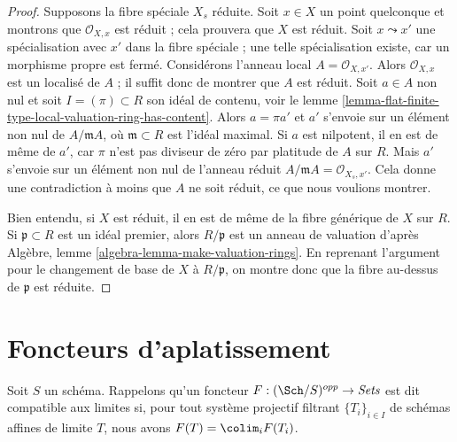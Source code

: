 \begin{proof}
Supposons la fibre spéciale $X_s$ réduite.
Soit $x \in X$ un point quelconque et montrons que $\mathcal{O}_{X, x}$
est réduit ; cela prouvera que $X$ est réduit.
Soit $x \leadsto x'$ une spécialisation avec $x'$
dans la fibre spéciale ; une telle spécialisation existe,
car un morphisme propre est fermé. Considérons l'anneau
local $A = \mathcal{O}_{X, x'}$. Alors $\mathcal{O}_{X, x}$
est un localisé de $A$ ; il suffit donc de montrer que
$A$ est réduit. Soit $a \in A$ non nul et soit $I = (\pi) \subset R$ son
idéal de contenu, voir le
lemme \ref{lemma-flat-finite-type-local-valuation-ring-has-content}.
Alors $a = \pi a'$ et $a'$ s'envoie sur un élément non nul de
$A/\mathfrak mA$, où $\mathfrak m \subset R$ est l'idéal maximal.
Si $a$ est nilpotent, il en est de même de $a'$, car $\pi$ n'est pas diviseur de zéro
par platitude de $A$ sur $R$.
Mais $a'$ s'envoie sur un élément non nul de l'anneau réduit
$A/\mathfrak m A = \mathcal{O}_{X_s, x'}$.
Cela donne une contradiction à moins que $A$ ne soit réduit, ce
que nous voulions montrer.

\medskip\noindent
Bien entendu, si $X$ est réduit, il en est de même de la fibre générique de $X$ sur $R$.
Si $\mathfrak p \subset R$ est un
idéal premier, alors $R/\mathfrak p$ est un anneau de valuation d'après
Algèbre, lemme \ref{algebra-lemma-make-valuation-rings}.
En reprenant l'argument pour le changement de base de $X$
à $R/\mathfrak p$, on montre donc que la fibre au-dessus de $\mathfrak p$
est réduite.
\end{proof}






\section{Foncteurs d'aplatissement}
\label{section-flattening-functors}

\noindent
Soit $S$ un schéma. Rappelons qu'un foncteur
$F : (\Sch/S)^{opp} \to \textit{Sets}$ est dit compatible aux limites
si, pour tout système projectif filtrant
$\{T_i\}_{i \in I}$ de schémas affines de limite $T$, nous avons
$F(T) = \colim_i F(T_i)$.

